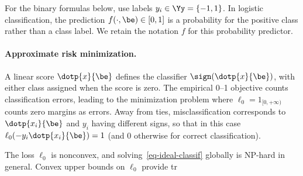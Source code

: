 For the binary formulas below, use labels $y_i \in \Yy = \{-1,1\}$. In logistic classification, the prediction $f(\cdot,\be) \in [0,1]$ is a probability for the positive class rather than a class label. We retain the notation $f$ for this probability predictor.


    
\paragraph{Approximate risk minimization.}

A linear score $\dotp{x}{\be}$ defines the classifier $\sign(\dotp{x}{\be})$, with either class assigned when the score is zero. The empirical 0--1 objective counts classification errors, leading to the minimization problem
where $\ell_0=1_{[0,+\infty)}$ counts zero margins as errors. Away from ties, misclassification corresponds to $\dotp{x_i}{\be}$ and $y_i$ having different signs, so that in this case $\ell_0(-y_i \dotp{x_i}{\be})=1$ (and 0 otherwise for correct classification).

The loss $\ell_0$ is nonconvex, and solving~\eqref{eq-ideal-classif} globally is NP-hard in general. Convex upper bounds on $\ell_0$ provide tr